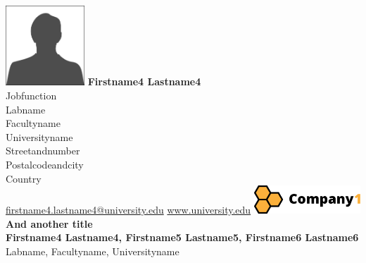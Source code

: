 \label{awec:03-presenter}
\abstractpage%
%
%
%
{%
\label{photo:03-presenter}
\includegraphics[height=3cm]{figures/AWEC03_Presenter.pdf}
}
%
{%
{\bfseries Firstname4 Lastname4}\\[\authorvsep]
%
Jobfunction\\
Labname\\[\addressvsep]
Facultyname\\
Universityname\\
Streetandnumber\\
Postalcodeandcity\\
Country\\[\addressvsep]
%
\href{mailto:firstname4.lastname4@university.edu}{firstname4.lastname4@university.edu}
\href{http://www.university.edu}{www.university.edu}
}
%
{%
\includegraphics[width=4cm]{figures/AWEC03_Logo.pdf}
}
%
%
%
%
{
{\Large\bfseries
And another title
}\\[2mm]
%
%
%
{\bfseries
{}
Firstname4 Lastname4, Firstname5 Lastname5, Firstname6 Lastname6
}\\
%
%
%
Labname, Facultyname, Universityname
}
%
%
%
